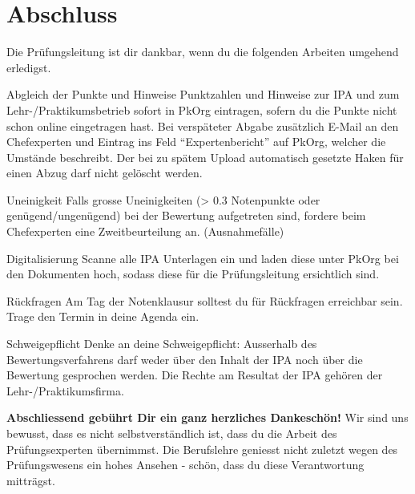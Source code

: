 \section{Abschluss}
Die Prüfungsleitung ist dir dankbar, wenn du die folgenden Arbeiten umgehend erledigst.

\begin{taskitemwithoutcomment}{Abgleich der Punkte und Hinweise}
  Punktzahlen und Hinweise zur IPA und zum Lehr-/Praktikumsbetrieb sofort in PkOrg eintragen, sofern du die Punkte nicht schon online eingetragen hast. Bei verspäteter Abgabe zusätzlich E-Mail an den Chefexperten und Eintrag ins Feld \enquote{Expertenbericht} auf PkOrg, welcher die Umstände beschreibt. Der bei zu spätem Upload automatisch gesetzte Haken für einen Abzug darf nicht gelöscht werden.
\end{taskitemwithoutcomment}
\begin{taskitemwithoutcomment}{Uneinigkeit}
  Falls grosse Uneinigkeiten (> 0.3 Notenpunkte oder genügend/ungenügend) bei der Bewertung aufgetreten sind, fordere beim Chefexperten eine Zweitbeurteilung an. (Ausnahmefälle)
\end{taskitemwithoutcomment}
\begin{taskitemwithoutcomment}{Digitalisierung}
  Scanne alle IPA Unterlagen ein und laden diese unter PkOrg bei den Dokumenten hoch, sodass diese für die Prüfungsleitung ersichtlich sind.
\end{taskitemwithoutcomment}
\begin{taskitemwithoutcomment}{Rückfragen}
  Am Tag der Notenklausur solltest du für Rückfragen erreichbar sein. Trage den Termin in deine Agenda ein.
\end{taskitemwithoutcomment}
\begin{taskitemwithoutcomment}{Schweigepflicht}
  Denke an deine Schweigepflicht: Ausserhalb des Bewertungsverfahrens darf weder über den Inhalt der IPA noch über die Bewertung gesprochen werden. Die Rechte am Resultat der IPA gehören der Lehr-/Praktikumsfirma.
\end{taskitemwithoutcomment}

\par

\textbf{Abschliessend gebührt Dir ein ganz herzliches Dankeschön!}
Wir sind uns bewusst, dass es nicht selbstverständlich ist, dass du die Arbeit des Prüfungsexperten übernimmst. Die Berufslehre geniesst nicht zuletzt wegen des Prüfungswesens ein hohes Ansehen - schön, dass du diese Verantwortung mitträgst.
